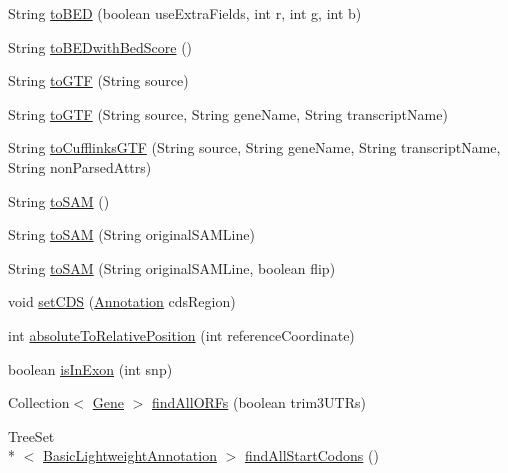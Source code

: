\begin{DoxyCompactItemize}
\item 
String \hyperlink{classumms_1_1core_1_1annotation_1_1_gene_aaa4cbae09246c3aa1fe38b2493cffe1f}{to\+B\+E\+D} (boolean use\+Extra\+Fields, int r, int g, int b)
\item 
String \hyperlink{classumms_1_1core_1_1annotation_1_1_gene_a81d7d12a4169e30d30eb5d330ed49ff4}{to\+B\+E\+Dwith\+Bed\+Score} ()
\item 
String \hyperlink{classumms_1_1core_1_1annotation_1_1_gene_a6f357c1e1ecdf63d35e0dc2e3acf15c4}{to\+G\+T\+F} (String source)
\item 
String \hyperlink{classumms_1_1core_1_1annotation_1_1_gene_a4783b59545d170c80ef1d64eedc1dc26}{to\+G\+T\+F} (String source, String gene\+Name, String transcript\+Name)
\item 
String \hyperlink{classumms_1_1core_1_1annotation_1_1_gene_a01bbf56d281f56164e72076a36169606}{to\+Cufflinks\+G\+T\+F} (String source, String gene\+Name, String transcript\+Name, String non\+Parsed\+Attrs)
\item 
String \hyperlink{classumms_1_1core_1_1annotation_1_1_gene_a7111a9fa6fe68ef711f3ffaee4950f82}{to\+S\+A\+M} ()
\item 
String \hyperlink{classumms_1_1core_1_1annotation_1_1_gene_ae429e2d677bfc7f60d896846fddc6268}{to\+S\+A\+M} (String original\+S\+A\+M\+Line)
\item 
String \hyperlink{classumms_1_1core_1_1annotation_1_1_gene_a072d298ac4b49aab8bde94492fe0e1ef}{to\+S\+A\+M} (String original\+S\+A\+M\+Line, boolean flip)
\item 
void \hyperlink{classumms_1_1core_1_1annotation_1_1_gene_aee850a4a9ec48d1cbcb91db4e71eadec}{set\+C\+D\+S} (\hyperlink{interfaceumms_1_1core_1_1annotation_1_1_annotation}{Annotation} cds\+Region)
\item 
int \hyperlink{classumms_1_1core_1_1annotation_1_1_gene_ace01f1a5b8413926a90d4e02eedc7e2e}{absolute\+To\+Relative\+Position} (int reference\+Coordinate)
\item 
boolean \hyperlink{classumms_1_1core_1_1annotation_1_1_gene_a6327a3395c20606b0b944cca1c9bee84}{is\+In\+Exon} (int snp)
\item 
Collection$<$ \hyperlink{classumms_1_1core_1_1annotation_1_1_gene}{Gene} $>$ \hyperlink{classumms_1_1core_1_1annotation_1_1_gene_a9ee9efb63f7d3cfd37e9f4300e026486}{find\+All\+O\+R\+Fs} (boolean trim3\+U\+T\+Rs)
\item 
Tree\+Set\\*
$<$ \hyperlink{classbroad_1_1core_1_1annotation_1_1_basic_lightweight_annotation}{Basic\+Lightweight\+Annotation} $>$ \hyperlink{classumms_1_1core_1_1annotation_1_1_gene_aaea8a567b50a5856f3d1be57678cb8a0}{find\+All\+Start\+Codons} ()

\end{DoxyCompactItemize}

